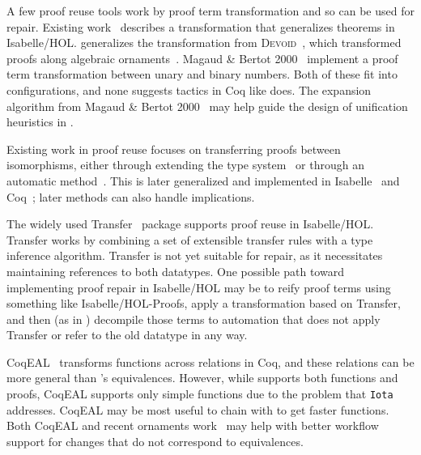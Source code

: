 
A few proof reuse tools work by proof term transformation and so can be used for repair.
Existing work~\cite{Johnsen2004} describes a transformation that generalizes theorems in Isabelle/HOL.
\toolnamec generalizes the transformation from \textsc{Devoid}~\cite{Ringer2019},
which transformed proofs along algebraic ornaments~\cite{mcbride}.
Magaud \& Bertot 2000~\cite{magaud2000changing} implement a proof term transformation between
unary and binary numbers. 
Both of these fit into \toolnamec configurations,
and none suggests tactics in Coq like \toolnamec does.
The expansion algorithm from Magaud \& Bertot 2000~\cite{magaud2000changing} may help guide the design
of unification heuristics in \toolnamec.


Existing work in proof reuse focuses on transferring proofs between isomorphisms,
either through extending the type system~\cite{Barthe:2001:TIP:646793.704711} or through an automatic method~\cite{Magaud2002}.
This is later generalized and implemented in Isabelle~\cite{Huffman2013} and Coq~\cite{ZimmermannH15, tabareau:hal-01559073};
later methods can also handle implications.


The widely used Transfer~\cite{Huffman2013} package supports proof reuse in Isabelle/HOL. %
Transfer works by combining a set of extensible transfer rules with a type inference algorithm.
Transfer is not yet suitable for repair, as it necessitates maintaining references to both datatypes.
One possible path toward implementing proof repair in Isabelle/HOL may be to reify proof terms using something like
Isabelle/HOL-Proofs, apply a transformation based on Transfer, and then (as in \toolname) decompile those terms to automation that does not apply Transfer or refer to the old datatype in any way.

CoqEAL~\cite{cohen:hal-01113453} transforms functions across relations in Coq,
and these relations can be more general than \toolnamec's equivalences.
However, while \toolnamec supports both functions and proofs, CoqEAL supports only simple functions
due to the problem that \lstinline{Iota} addresses.
CoqEAL may be most useful to chain with \toolnamec to get faster functions.
Both CoqEAL and recent ornaments work~\cite{williamsphd} may help with
better workflow support for changes that do not correspond to equivalences.

